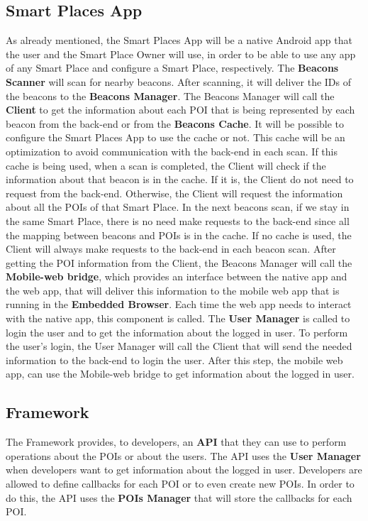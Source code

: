 \subsection{Smart Places App}
\label{sub:smart_places_app}
As already mentioned, the Smart Places App will be a native
Android app that the user and the Smart Place Owner will use,
in order to be able to use any app of any Smart Place
and configure a Smart Place, respectively.
The \textbf{Beacons Scanner} will scan for nearby
beacons. After scanning, it will deliver the IDs
of the beacons to the \textbf{Beacons Manager}.
The Beacons Manager will call the \textbf{Client} to
get the information about each POI that is being
represented by each beacon from the back-end or
from the \textbf{Beacons Cache}. It will be possible to
configure the Smart Places App to use the cache or not.
This cache will be an optimization to avoid communication
with the back-end in each scan. If this cache is being
used, when a scan is completed, the Client will
check if the information about that beacon is in
the cache. If it is, the Client do not need to request
from the back-end. Otherwise, the Client will
request the information about all the POIs of that
Smart Place. In the next beacons scan, if we stay in
the same Smart Place, there is no need make requests
to the back-end since all the mapping between beacons
and POIs is in the cache.
If no cache is used, the Client will always make requests
to the back-end in each beacon scan.
After getting the POI information from the Client,
the Beacons Manager will call the \textbf{Mobile-web bridge},
which provides an interface between the native app
and the web app, that will deliver this information
to the mobile web app that is running in the
\textbf{Embedded Browser}. 
Each time the web app needs to interact
with the native app, this component is called.
The \textbf{User Manager} is called to login the
user and to get the information about the logged
in user. To perform the user's login, the User Manager
will call the Client that will send the needed information
to the back-end to login the user. After this step,
the mobile web app, can use the Mobile-web bridge
to get information about the logged in user.

\subsection{Framework}
\label{sub:framework}
The Framework provides, to developers, an \textbf{API} that they
can use to perform operations about the POIs or about the users.
The API uses the \textbf{User Manager} when developers want to
get information about the logged in user.
Developers are allowed to define callbacks for each POI or to
even create new POIs. In order to do this, the API
uses the \textbf{POIs Manager} that will store the callbacks
for each POI.
